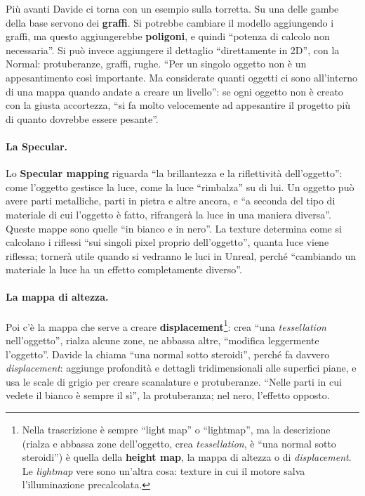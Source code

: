Più avanti Davide ci torna con un esempio sulla torretta. Su una delle gambe della base
servono dei \textbf{graffi}. Si potrebbe cambiare il modello aggiungendo i graffi, ma
questo aggiungerebbe \textbf{poligoni}, e quindi ``potenza di calcolo non
necessaria''. Si può invece aggiungere il dettaglio ``direttamente in 2D'', con la
Normal: protuberanze, graffi, rughe. ``Per un singolo oggetto non è un appesantimento
così importante. Ma considerate quanti oggetti ci sono all'interno di una mappa quando
andate a creare un livello'': se ogni oggetto non è creato con la giusta accortezza,
``si fa molto velocemente ad appesantire il progetto più di quanto dovrebbe essere
pesante''.

\paragraph{La Specular.} Lo \textbf{Specular mapping} riguarda ``la brillantezza e la
riflettività dell'oggetto'': come l'oggetto gestisce la luce, come la luce ``rimbalza''
su di lui. Un oggetto può avere parti metalliche, parti in pietra e altre ancora, e ``a
seconda del tipo di materiale di cui l'oggetto è fatto, rifrangerà la luce in una
maniera diversa''. Queste mappe sono quelle ``in bianco e in nero''. La texture
determina come si calcolano i riflessi ``sui singoli pixel proprio dell'oggetto'',
quanta luce viene riflessa; tornerà utile quando si vedranno le luci in Unreal, perché
``cambiando un materiale la luce ha un effetto completamente diverso''.

\paragraph{La mappa di altezza.} Poi c'è la mappa che serve a creare
\textbf{displacement}\footnote{Nella trascrizione è sempre ``light map'' o
``lightmap'', ma la descrizione (rialza e abbassa zone dell'oggetto, crea
\emph{tessellation}, è ``una normal sotto steroidi'') è quella della \textbf{height
map}, la mappa di altezza o di \emph{displacement}. Le \emph{lightmap} vere sono
un'altra cosa: texture in cui il motore salva l'illuminazione precalcolata.}: crea
``una \emph{tessellation} nell'oggetto'', rialza alcune zone, ne abbassa altre,
``modifica leggermente l'oggetto''. Davide la chiama ``una normal sotto steroidi'',
perché fa davvero \emph{displacement}: aggiunge profondità e dettagli tridimensionali
alle superfici piane, e usa le scale di grigio per creare scanalature e protuberanze.
``Nelle parti in cui vedete il bianco è sempre il sì'', la protuberanza; nel nero,
l'effetto opposto.

